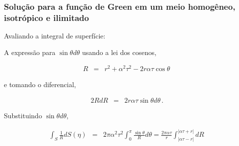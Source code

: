 \documentclass[xcolor=table]{beamer}
\begin{document}
\begin{frame}
\frametitle{\textbf{Solu\c{c}\~ao para a fun\c{c}\~ao de Green em um meio homog\^eneo, isotr\'opico e ilimitado}}
\begin{flushleft}
    \textcolor{red!60!black}{Avaliando a integral de superf\'icie:}
\end{flushleft}

\begin{flushleft}
 A express\~ao para $\sin \theta d\theta$ usando a lei dos cosenos,
\end{flushleft}
\begin{eqnarray}
  \label{ten1}
   R &=&  r^2 + \alpha^2 \tau^2  - 2r\alpha\tau \cos \theta\,
\end{eqnarray}
\begin{flushleft}
e tomando o diferencial,
\end{flushleft}
\begin{eqnarray}
  \label{ten1}
   2RdR &=& 2r\alpha\tau \sin \theta d\theta \, .
\end{eqnarray}
\begin{flushleft}
 Substituindo $\sin \theta d\theta$,
\end{flushleft}
\begin{eqnarray}
  \label{ten1}
   \int_{S} \frac{1}{R} dS(\eta)  &=& 2\pi \alpha^2 \tau^2 \int_{0}^{\pi} \frac{\sin \theta}{R} d\theta  = \frac{2\pi \alpha \tau}{r} \int_{\left| \alpha\tau -r \right|}^{\left| \alpha\tau +r \right|}  dR \, 
\end{eqnarray}

\end{frame}%
\end{document}
